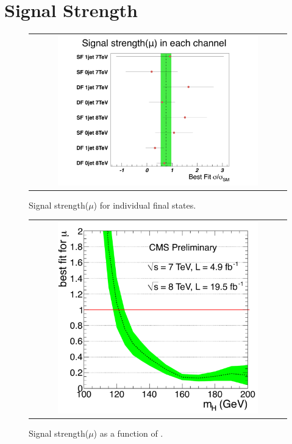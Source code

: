 \section{Signal Strength}



%
\begin{figure}[htp] 
\centering 
\begin{tabular}{c} 
\includegraphics[width=0.8\textwidth]{figures/mu_allchannels.pdf}
\end{tabular} 
\caption{ Signal strength($\mu$) for individual final states.} 
\label{fig:mu_allchannels} 
\end{figure} 

%
\begin{figure}[htp] 
\centering 
\begin{tabular}{c} 
\includegraphics[width=0.8\textwidth]{figures/mlf7p8TeV_zoomed.pdf}
\end{tabular} 
\caption{ Signal strength($\mu$) as a function of \mHi.} 
\label{fig:mu_mH} 
\end{figure} 

